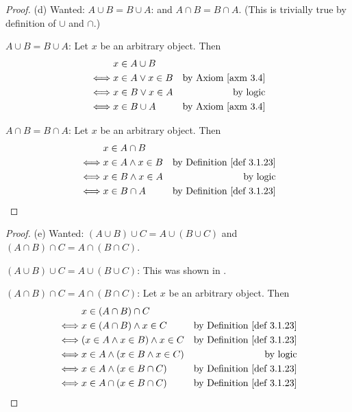 \begin{proof}{(d)} Wanted: \(A \cup B = B \cup A\): and \(A \cap B = B \cap A\). (This is trivially true by definition of \(\cup\) and \(\cap\).)

\(A \cup B = B \cup A\): Let \(x\) be an arbitrary object. Then
\begin{align*}
         & x \in A \cup B \\
    \iff & x \in A \lor x \in B & \text{by \AXM{3.4}} \\
    \iff & x \in B \lor x \in A & \text{by logic} \\
    \iff & x \in B \cup A & \text{by \AXM{3.4}} \\
\end{align*}

\(A \cap B = B \cap A\): Let \(x\) be an arbitrary object. Then
\begin{align*}
         & x \in A \cap B \\
    \iff & x \in A \land x \in B & \text{by \DEF{3.1.23}} \\
    \iff & x \in B \land x \in A & \text{by logic} \\
    \iff & x \in B \cap A & \text{by \DEF{3.1.23}} \\
\end{align*}
\end{proof}


\begin{proof}{(e)} Wanted: \((A \cup B) \cup C = A \cup (B \cup C)\) and \((A \cap B) \cap C = A \cap (B \cap C)\).

\((A \cup B) \cup C = A \cup (B \cup C)\): This was shown in .

\((A \cap B) \cap C = A \cap (B \cap C)\): Let \(x\) be an arbitrary object. Then
\begin{align*}
         & x \in (A \cap B) \cap C \\
    \iff & x \in (A \cap B) \land x \in C & \text{by \DEF{3.1.23}} \\
    \iff & (x \in A \land x \in B) \land x \in C & \text{by \DEF{3.1.23}} \\
    \iff & x \in A \land (x \in B \land x \in C) & \text{by logic} \\
    \iff & x \in A \land (x \in B \cap C) & \text{by \DEF{3.1.23}} \\
    \iff & x \in A \cap (x \in B \cap C) & \text{by \DEF{3.1.23}} \\
\end{align*}
\end{proof}


